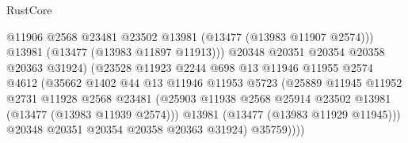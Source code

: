 \begin{lexlean}{RustCore}
\begin{coremodule}
                                          @11906
                                          @2568
                                          @23481
                                          @23502
                                          @13981
                                          (@13477 (@13983 @11907 @2574)))
                                        @13981
                                        (@13477 (@13983 @11897 @11913)))
                                      @20348
                                      @20351
                                      @20354
                                      @20358
                                      @20363
                                      @31924)
                                    (@23528
                                      @11923
                                      @2244
                                      @698
                                      @13
                                      @11946
                                      @11955
                                      @2574
                                      @4612
                                      (@35662
                                        @1402
                                        @44
                                        @13
                                        @11946
                                        @11953
                                        @5723
                                        (@25889
                                          @11945
                                          @11952
                                          @2731
                                          @11928
                                          @2568
                                          @23481
                                          (@25903
                                            @11938
                                            @2568
                                            @25914
                                            @23502
                                            @13981
                                            (@13477 (@13983 @11939 @2574)))
                                          @13981
                                          (@13477 (@13983 @11929 @11945)))
                                        @20348
                                        @20351
                                        @20354
                                        @20358
                                        @20363
                                        @31924)
                                      @35759))))

\end{coremodule}
\end{lexlean}
